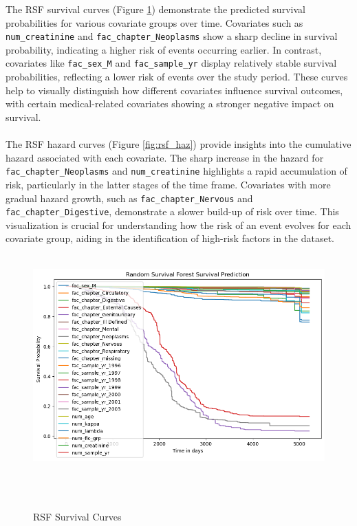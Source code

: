 \noindent The RSF survival curves (Figure \ref{fig:rsf_surv}) demonstrate the predicted survival probabilities for various covariate groups over time. Covariates such as \texttt{num\_creatinine} and \texttt{fac\_chapter\_Neoplasms} show a sharp decline in survival probability, indicating a higher risk of events occurring earlier. In contrast, covariates like \texttt{fac\_sex\_M} and \texttt{fac\_sample\_yr} display relatively stable survival probabilities, reflecting a lower risk of events over the study period. These curves help to visually distinguish how different covariates influence survival outcomes, with certain medical-related covariates showing a stronger negative impact on survival.
\\\\
\noindent The RSF hazard curves (Figure \ref{fig:rsf_haz}) provide insights into the cumulative hazard associated with each covariate. The sharp increase in the hazard for \texttt{fac\_chapter\_Neoplasms} and \texttt{num\_creatinine} highlights a rapid accumulation of risk, particularly in the latter stages of the time frame. Covariates with more gradual hazard growth, such as \texttt{fac\_chapter\_Nervous} and \texttt{fac\_chapter\_Digestive}, demonstrate a slower build-up of risk over time. This visualization is crucial for understanding how the risk of an event evolves for each covariate group, aiding in the identification of high-risk factors in the dataset.

\clearpage
\begin{figure}[h]
    \centering
    \includegraphics[scale=0.50]{Figures/SURV/rsf_survival.png}
    \caption{RSF Survival Curves}
    \label{fig:rsf_surv}
\end{figure}

